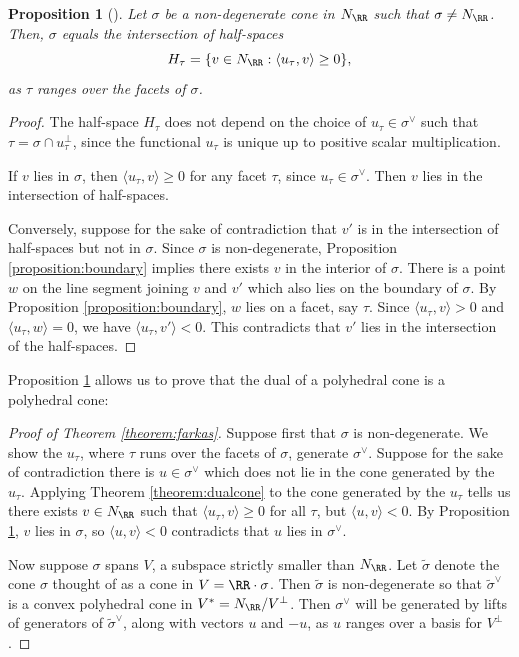 \documentclass[12pt]{amsart}
\theoremstyle{plain}
\newtheorem{proposition}[theorem]{Proposition}
\theoremstyle{definition}
\begin{document}
\begin{proposition}[{\cite[\S 1.2]{Fulton93}}]\label{proposition:dualdescription}
Let $\sigma$ be a non-degenerate cone in $N_\RR$ such that $\sigma \ne N_\RR$.
Then, $\sigma$ equals the intersection of half-spaces
$$H_\tau = \{v \in N_\RR : \langle u_\tau, v\rangle \ge 0\},$$
as $\tau$ ranges over the facets of $\sigma$.
\end{proposition}
\begin{proof}
The half-space $H_\tau$ does not depend on the choice of $u_\tau \in \sigma^\vee$ such that $\tau = \sigma \cap u_\tau^\perp$, since the functional $u_\tau$ is unique up to positive scalar multiplication.

If $v$ lies in $\sigma$, then $\langle u_\tau, v \rangle \ge 0$ for any facet $\tau$, since $u_\tau \in \sigma^\vee$.
Then $v$ lies in the intersection of half-spaces.

Conversely, suppose for the sake of contradiction that $v'$ is in the intersection of half-spaces but not in $\sigma$.
Since $\sigma$ is non-degenerate, Proposition \ref{proposition:boundary} implies there exists $v$ in the interior of $\sigma$.
There is a point $w$ on the line segment joining $v$ and $v'$ which also lies on the boundary of $\sigma$.
By Proposition \ref{proposition:boundary}, $w$ lies on a facet, say $\tau$.
Since $\langle u_\tau, v \rangle > 0$ and $\langle u_\tau, w \rangle = 0$, we have $\langle u_\tau, v' \rangle < 0$.
This contradicts that $v'$ lies in the intersection of the half-spaces.
\end{proof}

Proposition \ref{proposition:dualdescription} allows us to prove that the dual of a polyhedral cone is a polyhedral cone:

\begin{proof}[Proof of Theorem \ref{theorem:farkas}]
Suppose first that $\sigma$ is non-degenerate.
We show the $u_\tau$, where $\tau$ runs over the facets of $\sigma$, generate $\sigma^\vee$.
Suppose for the sake of contradiction there is $u \in \sigma^\vee$ which does not lie in the cone generated by the $u_\tau$.
Applying Theorem \ref{theorem:dualcone} to the cone generated by the $u_\tau$ tells us there exists $v \in N_\RR$ such that $\langle u_\tau, v\rangle \ge 0$ for all $\tau$, but $\langle u, v \rangle < 0$.
By Proposition \ref{proposition:dualdescription}, $v$ lies in $\sigma$, so $\langle u, v \rangle < 0$ contradicts that $u$ lies in $\sigma^\vee$.

Now suppose $\sigma$ spans $V$, a subspace strictly smaller than $N_\RR$.
Let $\tilde \sigma$ denote the cone $\sigma$ thought of as a cone in $V = \RR \cdot \sigma$.
Then $\tilde \sigma$ is non-degenerate so that $\tilde \sigma^\vee$ is a convex polyhedral cone in $V^* = N_\RR / V^\perp$.
Then $\sigma^\vee$ will be generated by lifts of generators of $\tilde \sigma^\vee$, along with vectors $u$ and $-u$, as $u$ ranges over a basis for $V^\perp$.
\end{proof}
\end{document}
